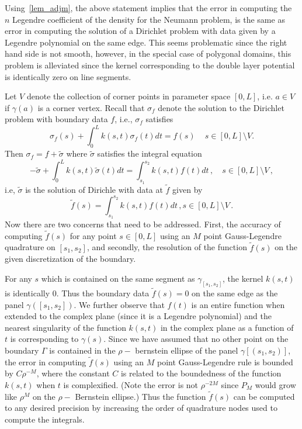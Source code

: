\documentclass[12pt]{article}
\begin{document}
Using~\cref{lem_adjm}, the above statement implies that the error in computing the $n$ Legendre coefficient of
the density for the Neumann problem, is the same as error in computing the solution of a Dirichlet problem with 
data given by a Legendre polynomial on the same edge.  This seems problematic since the right hand side
is not smooth, however, in the special case of polygonal domains, this problem is alleviated since the kernel corresponding
to the double layer potential is identically zero on line segments.

Let $V$ denote the collection of corner points in parameter space $[0,L]$, i.e. $a \in V$ if $\gamma(a)$ is a corner vertex.
Recall that $\sigma_{f}$ denote the solution to the Dirichlet problem with boundary data $f$, i.e., 
$\sigma_{f}$ satisfies
\begin{equation}
\sigma_{f}(s)   + \int_{0}^{L} k(s,t) \sigma_{f}(t) dt  = f(s) \,  \quad s\in[0,L]\setminus{V}.
\end{equation}
 Then $\sigma_{f} = f + \tilde{\sigma}$ where $\tilde{\sigma}$ satisfies the integral equation
 \begin{equation}
-\tilde{\sigma}+ \int_{0}^{L} k(s,t) \tilde{\sigma}(t) dt = \int_{s_{1}}^{s_{2}} k(s,t) f(t) dt \, , \quad s\in[0,L] \setminus V \, ,
 \end{equation}
i.e, $\tilde{\sigma}$ is the solution of Dirichle with data at $\tilde{f}$ given by
\begin{equation}
\tilde{f}(s) = \int_{s_{1}}^{s_{2}} k(s,t) f(t) dt \, , s \in [0,L] \setminus V \, .
\end{equation}
Now there are two concerns that need to be addressed. First, the accuracy of computing $\tilde{f}(s)$ 
for any point $s \in [0,L]$ using an $M$ point Gauss-Legendre quadrature on $[s_{1},s_{2}]$, and secondly, 
the resolution of the function $\tilde{f}(s)$ on the given discretization of the boundary. 

For any $s$ which is contained on the same segment as $\gamma_{[s_{1},s_{2}]}$, the kernel $k(s,t)$ is identically $0$.
Thus the boundary data $\tilde{f}(s)=0$  on the same edge as the panel $\gamma([s_{1},s_{2}])$. 
We further observe that $f(t)$ is an entire function when extended to the complex plane (since it is a Legendre polynomial)
and the nearest singularity of the function $k(s,t)$ in the complex plane as a function of $t$ is corresponding to $\gamma(s)$.
Since we have assumed that no other point on the boundary $\Gamma$ is contained in the $\rho-$ bernstein ellipse
of the panel $\gamma[(s_{1},s_{2})]$, 
the error in computing $\tilde{f}(s)$ using an $M$ point Gauss-Legendre rule is bounded by $C \rho^{-M}$, where
the constant $C$ is related to the boundedness of the function $k(s,t)$ when $t$ is complexified.
(Note the error is not $\rho^{-2M}$ since $P_{M}$ would grow like $\rho^{M}$ on the $\rho-$ Bernstein ellipse.) 
Thus the function $\tilde{f}(s)$ can be computed to any desired precision by increasing the order of quadrature nodes
used to compute the integrals. 
\end{document}
